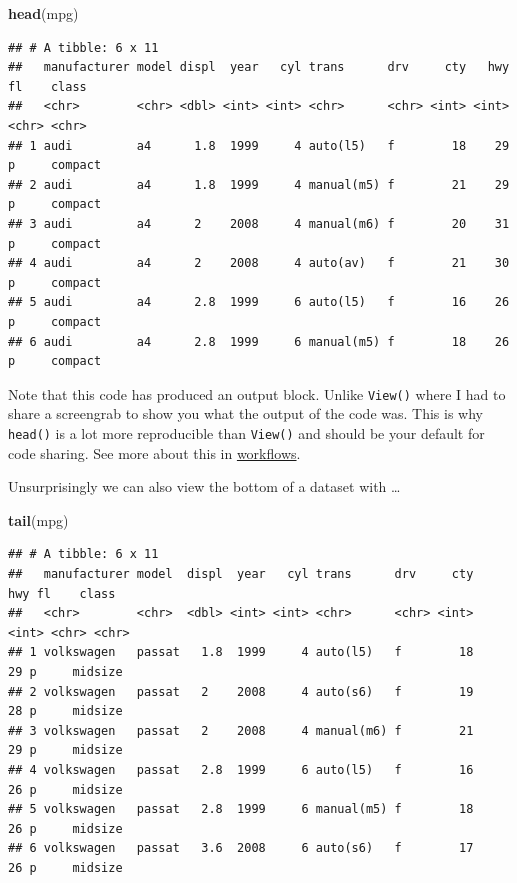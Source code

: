 \documentclass[
]{book}
\newenvironment{Shaded}{\begin{snugshade}}{\end{snugshade}}
\newcommand{\KeywordTok}[1]{\textcolor[rgb]{0.13,0.29,0.53}{\textbf{#1}}}
\newcommand{\NormalTok}[1]{#1}
\begin{document}
\begin{Shaded}
\begin{Highlighting}[]
 \KeywordTok{head}\NormalTok{(mpg)}
\end{Highlighting}
\end{Shaded}

\begin{verbatim}
## # A tibble: 6 x 11
##   manufacturer model displ  year   cyl trans      drv     cty   hwy fl    class  
##   <chr>        <chr> <dbl> <int> <int> <chr>      <chr> <int> <int> <chr> <chr>  
## 1 audi         a4      1.8  1999     4 auto(l5)   f        18    29 p     compact
## 2 audi         a4      1.8  1999     4 manual(m5) f        21    29 p     compact
## 3 audi         a4      2    2008     4 manual(m6) f        20    31 p     compact
## 4 audi         a4      2    2008     4 auto(av)   f        21    30 p     compact
## 5 audi         a4      2.8  1999     6 auto(l5)   f        16    26 p     compact
## 6 audi         a4      2.8  1999     6 manual(m5) f        18    26 p     compact
\end{verbatim}

Note that this code has produced an output block. Unlike \texttt{View()} where I had to share a screengrab to show you what the output of the code was. This is why \texttt{head()} is a lot more reproducible than \texttt{View()} and should be your default for code sharing. See more about this in \protect\hyperlink{workflows}{workflows}.

Unsurprisingly we can also view the bottom of a dataset with \ldots{}

\begin{Shaded}
\begin{Highlighting}[]
\KeywordTok{tail}\NormalTok{(mpg)}
\end{Highlighting}
\end{Shaded}

\begin{verbatim}
## # A tibble: 6 x 11
##   manufacturer model  displ  year   cyl trans      drv     cty   hwy fl    class  
##   <chr>        <chr>  <dbl> <int> <int> <chr>      <chr> <int> <int> <chr> <chr>  
## 1 volkswagen   passat   1.8  1999     4 auto(l5)   f        18    29 p     midsize
## 2 volkswagen   passat   2    2008     4 auto(s6)   f        19    28 p     midsize
## 3 volkswagen   passat   2    2008     4 manual(m6) f        21    29 p     midsize
## 4 volkswagen   passat   2.8  1999     6 auto(l5)   f        16    26 p     midsize
## 5 volkswagen   passat   2.8  1999     6 manual(m5) f        18    26 p     midsize
## 6 volkswagen   passat   3.6  2008     6 auto(s6)   f        17    26 p     midsize
\end{verbatim}
\end{document}
